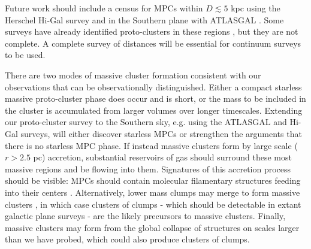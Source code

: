 


Future work should include a census for MPCs within $D\lesssim5$ kpc using the
Herschel Hi-Gal survey \citep{Molinari2010} and in the Southern plane with
ATLASGAL \citep{Schuller2009}.  Some surveys have already identified
proto-clusters in these regions \citep[e.g.][]{Faundez2004,Battersby2011}, but
they are not complete.  A complete survey of distances will be essential for
continuum surveys to be used.

There are two modes of massive cluster formation consistent with our
observations that can be observationally distinguished.  Either a compact
starless massive proto-cluster phase does occur and is short, or the mass to be
included in the cluster is accumulated from larger volumes over longer
timescales.  Extending our proto-cluster survey to the Southern sky, e.g. using
the ATLASGAL and Hi-Gal surveys, will either discover starless MPCs or
strengthen the arguments that there is no starless MPC phase.  If instead
massive clusters form by large scale ($r>2.5$ pc) accretion, substantial
reservoirs of gas should surround these most massive regions and be flowing
into them.  Signatures of this accretion process should be visible: MPCs should
contain molecular filamentary structures feeding into their centers
\citep[e.g.][]{Correnti2012,Hennemann2012,Liu2012}.  Alternatively, lower mass
clumps may merge to form massive clusters \citep{Fujii2012}, in which case
clusters of clumps - which should be detectable in extant galactic plane
surveys - are the likely precursors to massive clusters.  Finally, massive
clusters may form from the global collapse of structures on scales larger than
we have probed, which could also produce clusters of clumps.


